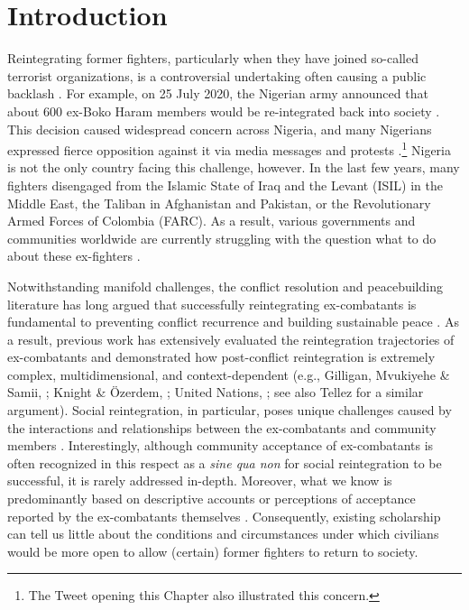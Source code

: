 \section{Introduction}

Reintegrating former fighters, particularly when they have joined so-called terrorist organizations, is a controversial undertaking often causing a public backlash \citep{Schuurman2016, Renard2018}. For example, on 25 July 2020, the Nigerian army announced that about 600 ex-Boko Haram members would be re-integrated back into society \citep{Ogunlade2020}. This decision caused widespread concern across Nigeria, and many Nigerians expressed fierce opposition against it via media messages and protests \citep{Vanguard2020, Vanguard2020a}.\footnote{The Tweet opening this Chapter also illustrated this concern.} Nigeria is not the only country facing this challenge, however. In the last few years, many fighters disengaged from the Islamic State of Iraq and the Levant (ISIL) in the Middle East, the Taliban in Afghanistan and Pakistan, or the Revolutionary Armed Forces of Colombia (FARC). As a result, various governments and communities worldwide are currently struggling with the question what to do about these ex-fighters \citep{Speckhard2020, Steadman2020}. 


Notwithstanding manifold challenges, the conflict resolution and peacebuilding literature has long argued that successfully reintegrating ex-combatants is fundamental to preventing conflict recurrence and building sustainable peace \citep{Knight2004}. As a result, previous work has extensively evaluated the reintegration trajectories of ex-combatants and demonstrated how post-conflict reintegration is extremely complex, multidimensional, and context-dependent (e.g., Gilligan, Mvukiyehe \& Samii, \citeyear{Gilligan2012}; Knight \& \"{O}zerdem, \citeyear{Knight2004}; United Nations, \citeyear{UN2014}; see also Tellez \citeyear{Tellez2019a} for a similar argument). Social reintegration, in particular, poses unique challenges caused by the interactions and relationships between the ex-combatants and community members \citep[][p. 133]{Kaplan2018}. Interestingly, although community acceptance of ex-combatants is often recognized in this respect as a \textit{sine qua non} for social reintegration to be successful, it is rarely addressed in-depth. Moreover, what we know is predominantly based on descriptive accounts or perceptions of acceptance reported by the ex-combatants themselves \citep[e.g.,][]{Humphreys2007, Pugel2007}. Consequently, existing scholarship can tell us little about the conditions and circumstances under which civilians would be more open to allow (certain) former fighters to return to society.


